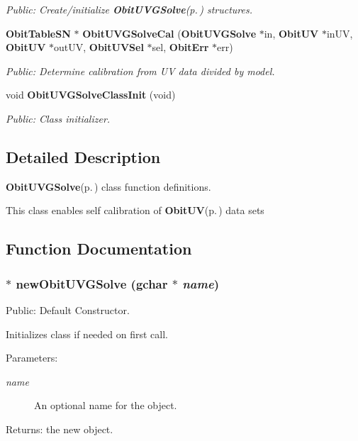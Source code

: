 \begin{CompactItemize}
\begin{CompactList}\small\item\em Public: Create/initialize {\bf Obit\-UVGSolve}{\rm (p.\,\pageref{structObitUVGSolve})} structures. \item\end{CompactList}\item 
{\bf Obit\-Table\-SN} $\ast$ {\bf Obit\-UVGSolve\-Cal} ({\bf Obit\-UVGSolve} $\ast$in, {\bf Obit\-UV} $\ast$in\-UV, {\bf Obit\-UV} $\ast$out\-UV, {\bf Obit\-UVSel} $\ast$sel, {\bf Obit\-Err} $\ast$err)
\begin{CompactList}\small\item\em Public: Determine calibration from UV data divided by model. \item\end{CompactList}\item 
void {\bf Obit\-UVGSolve\-Class\-Init} (void)
\begin{CompactList}\small\item\em Public: Class initializer. \item\end{CompactList}\end{CompactItemize}


\subsection{Detailed Description}
{\bf Obit\-UVGSolve}{\rm (p.\,\pageref{structObitUVGSolve})} class function definitions. 

This class enables self calibration of {\bf Obit\-UV}{\rm (p.\,\pageref{structObitUV})} data sets

\subsection{Function Documentation}
\subsubsection{$\ast$ new\-Obit\-UVGSolve (gchar $\ast$ {\em name})}\label{ObitUVGSolve_8c_a12}


Public: Default Constructor. 

Initializes class if needed on first call. \begin{Desc}
\item[Parameters:]
\begin{description}
\item[{\em name}]An optional name for the object. \end{description}
\end{Desc}
\begin{Desc}
\item[Returns:]the new object. \end{Desc}
